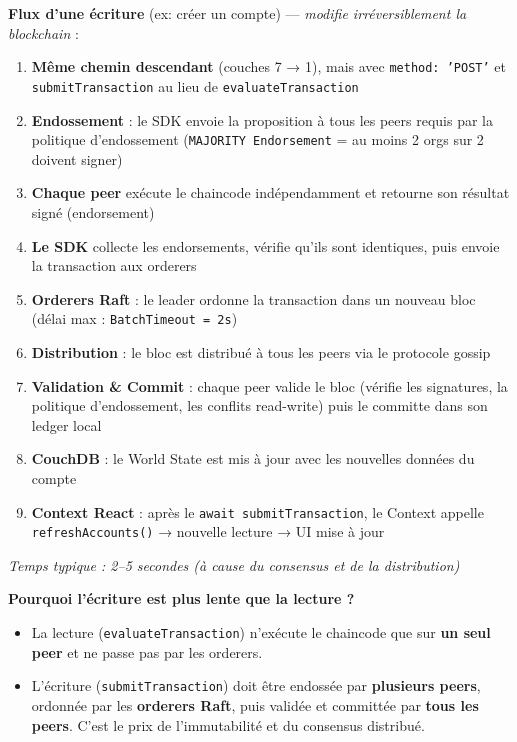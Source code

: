 \documentclass[12pt,a4paper,twoside]{report}
\begin{document}
\begin{warningbox}
\textbf{Flux d'une écriture} (ex: créer un compte) --- \textit{modifie irréversiblement la blockchain} :
\begin{enumerate}
    \item \textbf{Même chemin descendant} (couches 7 → 1), mais avec \texttt{method: 'POST'} et \texttt{submitTransaction} au lieu de \texttt{evaluateTransaction}
    \item \textbf{Endossement} : le SDK envoie la proposition à tous les peers requis par la politique d'endossement (\texttt{MAJORITY Endorsement} = au moins 2 orgs sur 2 doivent signer)
    \item \textbf{Chaque peer} exécute le chaincode indépendamment et retourne son résultat signé (endorsement)
    \item \textbf{Le SDK} collecte les endorsements, vérifie qu'ils sont identiques, puis envoie la transaction aux orderers
    \item \textbf{Orderers Raft} : le leader ordonne la transaction dans un nouveau bloc (délai max : \texttt{BatchTimeout = 2s})
    \item \textbf{Distribution} : le bloc est distribué à tous les peers via le protocole gossip
    \item \textbf{Validation \& Commit} : chaque peer valide le bloc (vérifie les signatures, la politique d'endossement, les conflits read-write) puis le committe dans son ledger local
    \item \textbf{CouchDB} : le World State est mis à jour avec les nouvelles données du compte
    \item \textbf{Context React} : après le \texttt{await submitTransaction}, le Context appelle \texttt{refreshAccounts()} → nouvelle lecture → UI mise à jour
\end{enumerate}
\textit{Temps typique : 2--5 secondes (à cause du consensus et de la distribution)}
\end{warningbox}

\begin{tipbox}
\textbf{Pourquoi l'écriture est plus lente que la lecture ?}
\begin{itemize}
    \item La lecture (\texttt{evaluateTransaction}) n'exécute le chaincode que sur \textbf{un seul peer} et ne passe pas par les orderers.
    \item L'écriture (\texttt{submitTransaction}) doit être endossée par \textbf{plusieurs peers}, ordonnée par les \textbf{orderers Raft}, puis validée et committée par \textbf{tous les peers}. C'est le prix de l'immutabilité et du consensus distribué.
\end{itemize}
\end{tipbox}
\end{document}
